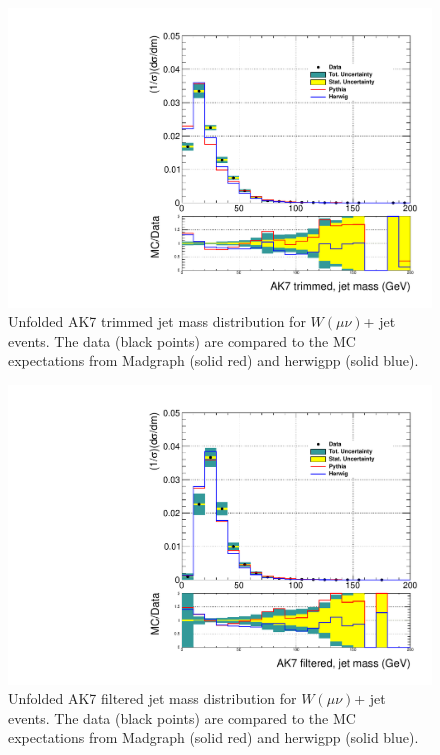 \begin{figure}[!htb]\centering\includegraphics[width=1.\textwidth]{figs/Wmn/jetmassunf_ak7tr_allpT.pdf}
\caption{Unfolded AK7 trimmed jet mass distribution for $W(\mu\nu)$+ jet events. The data (black points) are compared to the MC expectations from Madgraph (solid red) and herwigpp (solid blue).}
\label{figs:AK7WmnInt3}
\end{figure}


\begin{figure}[!htb]\centering\includegraphics[width=1.\textwidth]{figs/Wmn/jetmassunf_ak7ft_allpT.pdf}
\caption{Unfolded AK7 filtered jet mass distribution for $W(\mu\nu)$+ jet events. The data (black points) are compared to the MC expectations from Madgraph (solid red) and herwigpp (solid blue).}
\label{figs:AK7WmnInt4}
\end{figure}


